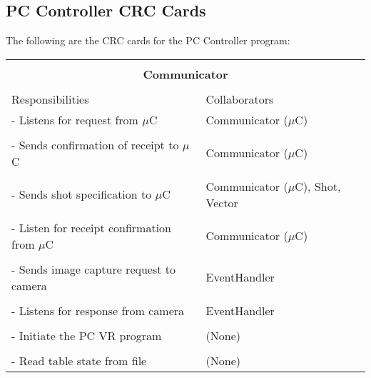 \documentclass[titlepage]{article}
\begin{document}
\subsection{PC Controller CRC Cards}
The following are the CRC cards for the PC Controller program:\\
\begin{table}[!htbp]
\centering
\begin{tabular}{| p{} | p{} |}\hline
	\multicolumn{2}{|l|}{}\\
	\multicolumn{2}{|c|}{\large{\textbf{Communicator}}}\\
	\multicolumn{2}{|l|}{}\\\hline
	\vspace{0mm}\large{Responsibilities}\vspace{2mm} &\vspace{0mm}\large{Collaborators}\vspace{2mm}\\\hline
	\vspace{0mm}- Listens for request from $\mu$C	&\vspace{0mm}Communicator ($\mu$C)\\&\\
	- Sends confirmation of receipt to $\mu$C		&Communicator ($\mu$C)\\&\\
	- Sends shot specification to $\mu$C			&Communicator ($\mu$C), Shot, Vector\\&\\
	- Listen for receipt confirmation from $\mu$C	&Communicator ($\mu$C)\\&\\
	- Sends image capture request to camera			&EventHandler\\&\\
	- Listens for response from camera				&EventHandler\\&\\
	- Initiate the PC VR program					&(None)\\&\\
	- Read table state from file\vspace{2mm}		&(None)\vspace{2mm}\\\hline
\end{tabular}
\end{table}
\newpage
\end{document}
